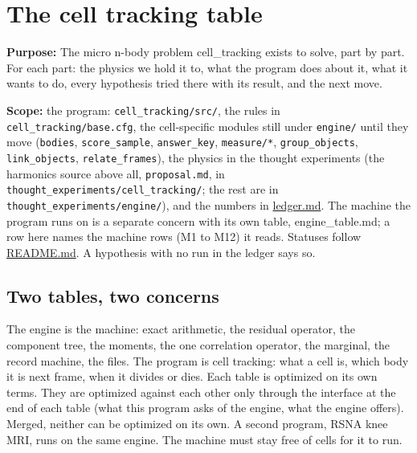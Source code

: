 \chapter{\texorpdfstring{The cell tracking table}{The cell tracking table}}
\label{chap:cell-tracking-table}

\textbf{Purpose:} The micro n-body problem cell\_\allowbreak{}tracking exists to solve, part by part. For each part: the physics we hold it to, what the program does about it, what it wants to do, every hypothesis tried there with its result, and the next move.

\textbf{Scope:} the program: \texttt{cell\_\allowbreak{}tracking/\allowbreak{}src/\allowbreak{}}, the rules in \texttt{cell\_\allowbreak{}tracking/\allowbreak{}base.\allowbreak{}cfg}, the cell-specific modules still under \texttt{engine/\allowbreak{}} until they move (\texttt{bodies}, \texttt{score\_\allowbreak{}sample}, \texttt{answer\_\allowbreak{}key}, \texttt{measure/\allowbreak{}*}, \texttt{group\_\allowbreak{}objects}, \texttt{link\_\allowbreak{}objects}, \texttt{relate\_\allowbreak{}frames}), the physics in the thought experiments (the harmonics source above all, \texttt{proposal.\allowbreak{}md}, in \texttt{thought\_\allowbreak{}experiments/\allowbreak{}cell\_\allowbreak{}tracking/\allowbreak{}}; the rest are in \texttt{thought\_\allowbreak{}experiments/\allowbreak{}engine/\allowbreak{}}), and the numbers in \hyperref[chap:ledger]{ledger.md}. The machine the program runs on is a separate concern with its own table, engine\_\allowbreak{}table.md; a row here names the machine rows (M1 to M12) it reads. Statuses follow \hyperref[chap:readme]{README.md}. A hypothesis with no run in the ledger says so.

\section{\texorpdfstring{Two tables, two concerns}{Two tables, two concerns}}

The engine is the machine: exact arithmetic, the residual operator, the component tree, the moments, the one correlation operator, the marginal, the record machine, the files. The program is cell tracking: what a cell is, which body it is next frame, when it divides or dies. Each table is optimized on its own terms. They are optimized against each other only through the interface at the end of each table (what this program asks of the engine, what the engine offers). Merged, neither can be optimized on its own. A second program, RSNA knee MRI, runs on the same engine. The machine must stay free of cells for it to run.

